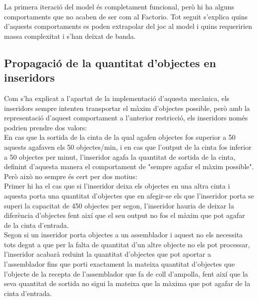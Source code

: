 La primera iteració del model és completament funcional, però hi ha alguns comportaments que no acaben de ser com al Factorio. Tot seguit s'explica quins d'aquests comportaments es poden extrapolar del joc al model i quins requeririen massa complexitat i s'han deixat de banda.

\subsection{Propagació de la quantitat d'objectes en inseridors}

Com s'ha explicat a l'apartat de la implementació d'aquesta mecànica, els inseridors sempre intenten transportar el màxim d'objectes possible, però amb la representació d'aquest comportament a l'anterior restricció, els inseridors només podrien prendre dos valors:\\
En cas que la sortida de la cinta de la qual agafen objectes fos superior a 50 aquests agafaven els 50 objectes/min, i en cas que l'output de la cinta fos inferior a 50 objectes per minut, l'inseridor agafa la quantitat de sortida de la cinta, definint d'aquesta manera el comportament de "sempre agafar el màxim possible". Però això no sempre és cert per dos motius:\\

Primer hi ha el cas que si l'inseridor deixa els objectes en una altra cinta i aquesta porta una quantitat d'objectes que en afegir-se els que l'inseridor porta se superi la capacitat de 450 objectes per segon, l'inseridor hauria de deixar la diferència d'objectes fent així que el seu output no fos el màxim que pot agafar de la cinta d'entrada.\\
Segon si un inseridor porta objectes a un assemblador i aquest no els necessita tots degut a que per la falta de quantitat d'un altre objecte no els pot processar, l'inseridor acabarà reduint la quantitat d'objectes que pot aportar a l'assemblador fins que porti exactament la mateixa quantitat d'objectes que l'objecte de la recepta de l'assemblador que fa de coll d'ampolla, fent així que la seva quantitat de sortida no sigui la mateixa que la màxima que pot agafar de la cinta d'entrada.\\

